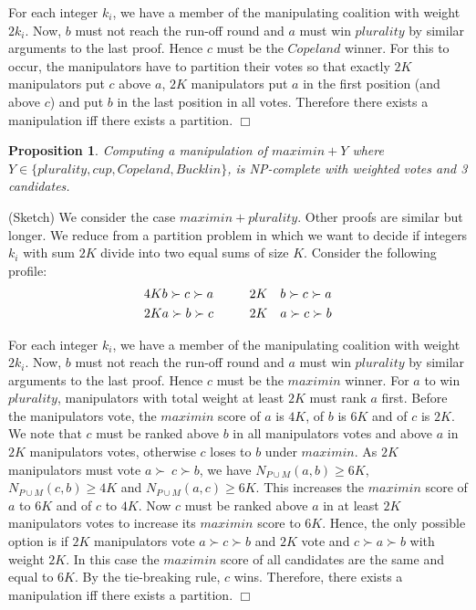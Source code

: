 \documentclass{ecai2012}
\newcommand{\winner}[2]{\mbox{$#1 + #2$}}
\newtheorem{proposition}{Proposition}
\newcommand{\myproof}{\vspace{-3mm}\noindent {\bf Proof:\ \ }}
\newcommand{\myqed}{\mbox{$\Box$}}
\begin{document}
\vspace{-2mm}For each
integer $k_i$, we have a member of the manipulating coalition
with weight $2k_i$.
Now, $b$ must not reach the run-off round and
$a$ must win $plurality$ by similar arguments
to the last proof. Hence $c$ must be the $Copeland$
winner.
For this to occur, the manipulators have to partition
their votes so that exactly $2K$ manipulators put $c$
above $a$, $2K$ manipulators put $a$
in the first position (and above $c$)
and put $b$ in the last position in all votes.
 Therefore there exists a manipulation
iff there exists a partition.
\myqed
\vspace{-2mm}
\begin{proposition}
Computing a manipulation of $\winner{maximin}{Y}$ where
$Y \in \{plurality, cup, Copeland, Bucklin\}$,
is NP-complete with weighted votes and 3 candidates.
\end{proposition}
\myproof (Sketch)
We consider the case $\winner{maximin}{plurality}$. Other
proofs are similar but longer.
We reduce from a  {\sc  partition} problem in which we
want to decide if integers $k_i$ with sum
$2K$ divide into two equal sums of size $K$.
Consider the following profile:
\vspace{-5mm}\begin{eqnarray*}
4K&b \succ c \succ a \hspace{10mm}
2K&b \succ c \succ a \\
2K&a \succ b \succ c \hspace{10mm}
2K&a \succ c \succ b
\end{eqnarray*}

\vspace{-3mm}For each
integer $k_i$, we have a member of the manipulating coalition
with weight $2k_i$.
Now, $b$ must not reach the run-off round and
$a$ must win $plurality$ by similar arguments
to the last proof. Hence $c$ must be the $maximin$
winner.
For $a$ to win $plurality$, manipulators
with total weight at least $2K$ must rank $a$ first.
Before the manipulators vote,
the $maximin$ score of $a$ is $4K$,
of $b$ is $6K$ and of $c$ is $2K$.
We note that $c$ must be ranked above $b$ in all manipulators
votes and above $a$ in $2K$ manipulators votes,
otherwise $c$ loses to $b$ under $maximin$.
As $2K$ manipulators
must vote $a \succ\ c \succ b$,
we have $N_{P \cup M}(a,b) \geq 6K$,
$N_{P \cup M}(c,b) \geq 4K$ and $N_{P \cup M}(a,c) \geq 6K$.
This increases the $maximin$ score of $a$ to $6K$
and of $c$ to $4K$.
Now $c$ must be ranked
above $a$ in at least $2K$ manipulators votes to increase
its $maximin$ score to $6K$. Hence, the only possible
option is if $2K$ manipulators
vote $a \succ c \succ b$ and $2K$ vote
and $c \succ  a \succ b$ with weight $2K$.
In this case the $maximin$ score of all candidates are the same
and equal to $6K$. By the tie-breaking rule, $c$ wins.
Therefore, there exists a manipulation iff there exists a partition.
\myqed
\end{document}
